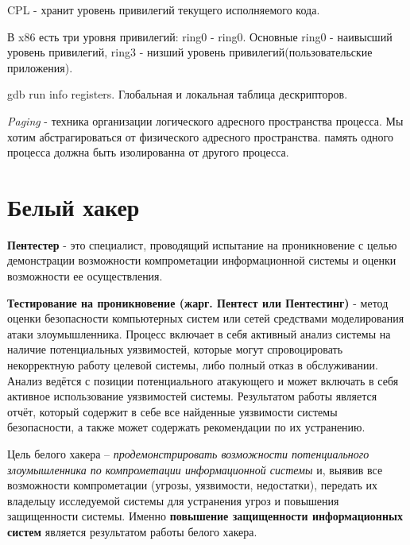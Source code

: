 	\par CPL - хранит уровень привилегий текущего исполняемого кода.
	
	\par В x86 есть три уровня привилегий: ring0 - ring0. Основные ring0 - наивысший уровень привилегий, ring3 - низший уровень привилегий(пользовательские приложения).
	
	\par gdb run info registers. Глобальная и локальная таблица дескрипторов.
	
	\par \textit{Paging} - техника организации логического адресного пространства процесса. Мы хотим абстрагироваться от физического адресного пространства. память одного процесса должна быть изолированна от другого процесса.
	
	\section{Белый хакер}
	
	\par \textbf{Пентестер} - это специалист, проводящий испытание на проникновение с целью демонстрации возможности компрометации информационной системы и оценки возможности ее осуществления.
	
	\par \textbf{Тестирование на проникновение (жарг. Пентест или Пентестинг)} - метод оценки безопасности компьютерных систем или сетей средствами моделирования атаки злоумышленника. Процесс включает в себя активный анализ системы на наличие потенциальных уязвимостей, которые могут спровоцировать некорректную работу целевой системы, либо полный отказ в обслуживании. Анализ ведётся с позиции потенциального атакующего и может включать в себя активное использование уязвимостей системы. Результатом работы является отчёт, который содержит в себе все найденные уязвимости системы безопасности, а также может содержать рекомендации по их устранению. 
	
	\par Цель белого хакера – \textit{продемонстрировать возможности потенциального злоумышленника по компрометации информационной системы} и, выявив все возможности компрометации (угрозы, уязвимости, недостатки), передать их владельцу исследуемой системы для устранения угроз и повышения защищенности системы. Именно \textbf{повышение защищенности информационных систем} является результатом работы белого хакера.
	
